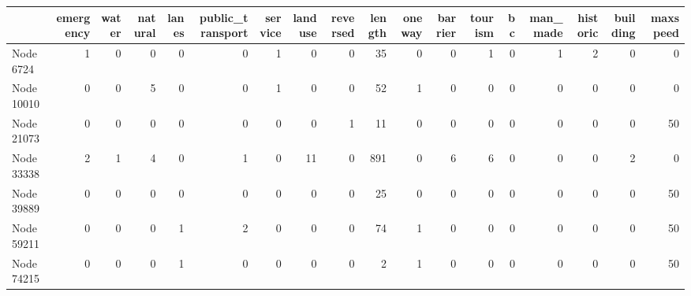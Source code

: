 \begin{tabular}{lrrrrrrrrrrrrrrrrr}
\toprule
 & emergency & water & natural & lanes & public_transport & service & landuse & reversed & length & oneway & barrier & tourism & bc & man_made & historic & building & maxspeed \\
\midrule
Node 6724 & 1 & 0 & 0 & 0 & 0 & 1 & 0 & 0 & 35 & 0 & 0 & 1 & 0 & 1 & 2 & 0 & 0 \\
Node 10010 & 0 & 0 & 5 & 0 & 0 & 1 & 0 & 0 & 52 & 1 & 0 & 0 & 0 & 0 & 0 & 0 & 0 \\
Node 21073 & 0 & 0 & 0 & 0 & 0 & 0 & 0 & 1 & 11 & 0 & 0 & 0 & 0 & 0 & 0 & 0 & 50 \\
Node 33338 & 2 & 1 & 4 & 0 & 1 & 0 & 11 & 0 & 891 & 0 & 6 & 6 & 0 & 0 & 0 & 2 & 0 \\
Node 39889 & 0 & 0 & 0 & 0 & 0 & 0 & 0 & 0 & 25 & 0 & 0 & 0 & 0 & 0 & 0 & 0 & 50 \\
Node 59211 & 0 & 0 & 0 & 1 & 2 & 0 & 0 & 0 & 74 & 1 & 0 & 0 & 0 & 0 & 0 & 0 & 50 \\
Node 74215 & 0 & 0 & 0 & 1 & 0 & 0 & 0 & 0 & 2 & 1 & 0 & 0 & 0 & 0 & 0 & 0 & 50 \\
\bottomrule
\end{tabular}
